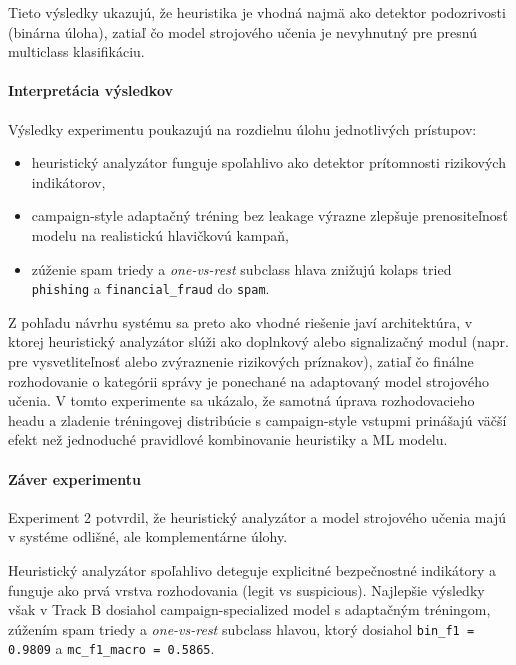 \documentclass[conference]{IEEEtran}
\begin{document}
Tieto výsledky ukazujú, že heuristika je vhodná najmä ako detektor podozrivosti (binárna úloha), zatiaľ čo model strojového učenia je nevyhnutný pre presnú multiclass klasifikáciu.

\paragraph{Interpretácia výsledkov}

Výsledky experimentu poukazujú na rozdielnu úlohu jednotlivých prístupov:

\begin{itemize}
    \item heuristický analyzátor funguje spoľahlivo ako detektor prítomnosti rizikových indikátorov,
    \item campaign-style adaptačný tréning bez leakage výrazne zlepšuje prenositeľnosť modelu na realistickú hlavičkovú kampaň,
    \item zúženie spam triedy a \textit{one-vs-rest} subclass hlava znižujú kolaps tried \texttt{phishing} a \texttt{financial\_fraud} do \texttt{spam}.
\end{itemize}

Z pohľadu návrhu systému sa preto ako vhodné riešenie javí architektúra, v ktorej heuristický analyzátor slúži ako doplnkový alebo signalizačný modul (napr. pre vysvetliteľnosť alebo zvýraznenie rizikových príznakov), zatiaľ čo finálne rozhodovanie o kategórii správy je ponechané na adaptovaný model strojového učenia. V tomto experimente sa ukázalo, že samotná úprava rozhodovacieho headu a zladenie tréningovej distribúcie s campaign-style vstupmi prinášajú väčší efekt než jednoduché pravidlové kombinovanie heuristiky a ML modelu.

\paragraph{Záver experimentu}

Experiment 2 potvrdil, že heuristický analyzátor a model strojového učenia majú v systéme odlišné, ale komplementárne úlohy.

Heuristický analyzátor spoľahlivo deteguje explicitné bezpečnostné indikátory a funguje ako prvá vrstva rozhodovania (legit vs suspicious). Najlepšie výsledky však v Track B dosiahol campaign-specialized model s adaptačným tréningom, zúžením spam triedy a \textit{one-vs-rest} subclass hlavou, ktorý dosiahol \texttt{bin\_f1 = 0.9809} a \texttt{mc\_f1\_macro = 0.5865}.
\end{document}
